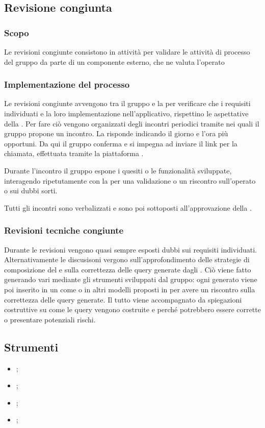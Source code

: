 \subsection{Revisione congiunta}\label{revisione_congiunta}

\subsubsection{Scopo}
\par Le revisioni congiunte consistono in attività per validare le attività di processo del gruppo da parte di un componente esterno, che ne valuta l'operato

\subsubsection{Implementazione del processo}
\par Le revisioni congiunte avvengono tra il gruppo e la  per verificare che i requisiti individuati e la loro implementazione nell'applicativo, rispettino le aspettative della . Per fare ciò vengono organizzati degli incontri periodici tramite  nei quali il gruppo propone un incontro. La  risponde indicando il giorno e l'ora più opportuni. Da qui il gruppo conferma e si impegna ad inviare il link per la chiamata, effettuata tramite la piattaforma .
\par Durante l'incontro il gruppo espone i quesiti o le funzionalità sviluppate, interagendo ripetutamente con la  per una validazione o un riscontro sull'operato o sui dubbi sorti.
\par Tutti gli incontri sono verbalizzati e sono poi sottoposti all'approvazione della .

\subsubsection{Revisioni tecniche congiunte}
\par Durante le revisioni vengono quasi sempre esposti dubbi sui requisiti individuati. Alternativamente le discusisoni vergono sull'approfondimento delle strategie di composizione del  e sulla correttezza delle query generate dagli . Ciò viene fatto generando vari  mediante gli strumenti sviluppati dal gruppo: ogni  generato viene poi inserito in un  come  o in altri modelli proposti in  per avere un riscontro sulla correttezza delle query generate. Il tutto viene accompagnato da spiegazioni costruttive su come le query vengono costruite e perché potrebbero essere corrette o presentare potenziali rischi.

\subsection{Strumenti}
\begin{itemize}
    \item {};
    \item {};
    \item {};
    \item {};
\end{itemize}